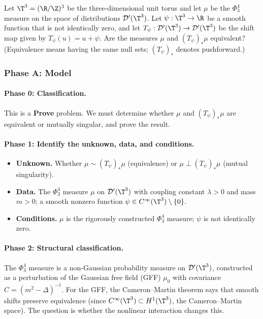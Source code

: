 Let $\T^3 = (\R / \Z)^3$ be the three-dimensional unit torus and let $\mu$
be the $\Phi^4_3$ measure on the space of distributions $\mathcal{D}'(\T^3)$.
Let $\psi : \T^3 \to \R$ be a smooth function that is not identically zero,
and let $T_\psi : \mathcal{D}'(\T^3) \to \mathcal{D}'(\T^3)$ be the shift map
given by $T_\psi(u) = u + \psi$. Are the measures $\mu$ and $(T_\psi)_* \mu$
equivalent? (Equivalence means having the same null sets; $(T_\psi)_*$ denotes
pushforward.)


\subsubsection*{Phase A: Model}

\paragraph{Phase 0: Classification.}
This is a \textbf{Prove} problem. We must determine whether $\mu$ and
$(T_\psi)_*\mu$ are equivalent or mutually singular, and prove the result.

\paragraph{Phase 1: Identify the unknown, data, and conditions.}
\begin{itemize}
\item \textbf{Unknown.} Whether $\mu \sim (T_\psi)_*\mu$ (equivalence)
  or $\mu \perp (T_\psi)_*\mu$ (mutual singularity).
\item \textbf{Data.} The $\Phi^4_3$ measure $\mu$ on $\mathcal{D}'(\T^3)$
  with coupling constant $\lambda > 0$ and mass $m > 0$;
  a smooth nonzero function $\psi \in C^\infty(\T^3) \setminus \{0\}$.
\item \textbf{Conditions.} $\mu$ is the rigorously constructed $\Phi^4_3$
  measure; $\psi$ is not identically zero.
\end{itemize}

\paragraph{Phase 2: Structural classification.}
The $\Phi^4_3$ measure is a non-Gaussian probability measure on
$\mathcal{D}'(\T^3)$, constructed as a perturbation of the Gaussian free field
(GFF) $\mu_0$ with covariance $C = (m^2 - \Delta)^{-1}$. For the GFF, the
Cameron--Martin theorem says that smooth shifts preserve equivalence (since
$C^\infty(\T^3) \subset H^1(\T^3)$, the Cameron--Martin space). The question
is whether the nonlinear interaction changes this.

